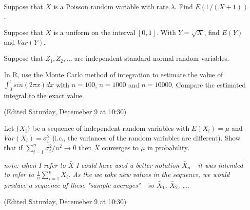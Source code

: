 \documentclass[addpoints]{examsetup}\usepackage[]{graphicx}\usepackage[]{color}
\begin{document}



\examCoverPage

\begin{questions}
\question[5] 
Suppose that $X$ is a Poisson random variable with rate $\lambda$. Find $E(1/(X + 1))$.

\question[5] 
Suppose that $X$ is a uniform on the interval $[0, 1]$. With $Y = \sqrt{X}$, find $E(Y)$ and $Var(Y)$.

\question
Suppose that $Z_1, Z_2, \ldots$ are independent standard normal random variables. 

\question[10] 
In R, use the Monte Carlo method of integration to estimate the value of $\int_{0}^1 sin(2 \pi x) dx$ with $n = 100$, $n = 1000$ and $n = 10000$. Compare the estimated integral to the exact value.

\question[5] 

(Edited Saturday, Decemeber 9 at 10:30)

Let $\{X_i\}$ be a sequence of independent random variables with $E(X_i) = \mu$ and $Var(X_i) = \sigma_i^2$ (i.e., the variances of the random variables are different). Show that if $\sum_{i=1}^n \sigma_i^2/n^2 \rightarrow 0$ then $\bar{X}$ converges to $\mu$ in probability.

\textit{note: when I refer to $\bar{X}$ I could have used a better notation $\bar{X}_n$ - it was intended to refer to $\frac{1}{n}\sum_{i=1}^n X_i$. As the we take new values in the sequence, we would produce a sequence of these "sample averages" - so $\bar{X}_1$, $\bar{X}_2$, \ldots.}

\question

(Edited Saturday, Decemeber 9 at 10:30)


\end{questions}
\end{document}

